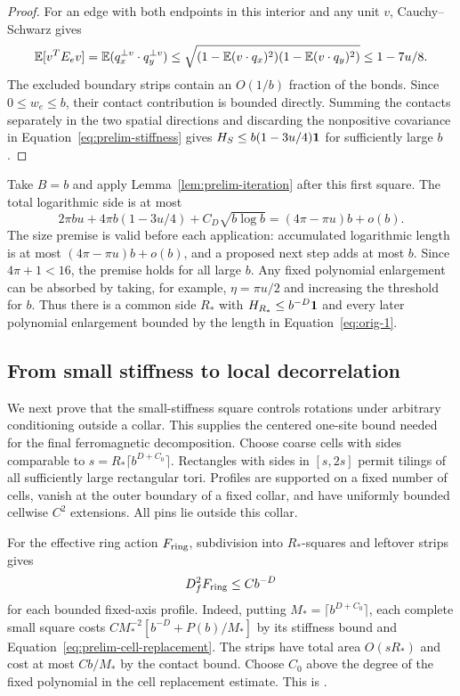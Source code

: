 \begin{proof}
For an edge with both endpoints in this interior and any unit $v$,
Cauchy--Schwarz gives
\[
 \mathbb E[v^TE_ev]
 =\mathbb E(q_x^{\perp v}\cdot q_y^{\perp v})
 \le\sqrt{(1-\mathbb E(v\cdot q_x)^2)(1-\mathbb E(v\cdot q_y)^2)}
 \le1-7u/8.
\]
The excluded boundary strips contain an $O(1/b)$ fraction of the
bonds. Since $0\le w_e\le b$, their contact contribution is bounded
directly. Summing the contacts separately in the two spatial directions
and discarding the nonpositive covariance in
Equation~\eqref{eq:prelim-stiffness} gives
$H_S\le b(1-3u/4)\mathbf 1$ for sufficiently large $b$.
\end{proof}

Take $B=b$ and apply Lemma~\ref{lem:prelim-iteration} after this first
square. The total logarithmic side is at most
\begin{equation}
 2\pi bu+4\pi b(1-3u/4)+C_D\sqrt{b\log b}
 =(4\pi-\pi u)b+o(b).
 \label{eq:prelim-total-length}
\end{equation}
The size premise is valid before each application: accumulated
logarithmic length is at most $(4\pi-\pi u)b+o(b)$, and a proposed next
step adds at most $b$. Since $4\pi+1<16$, the premise holds for all
large $b$. Any fixed polynomial enlargement can be absorbed by taking,
for example, $\eta=\pi u/2$ and increasing the threshold for $b$.
Thus there is a common side $R_*$ with
$H_{R_*}\le b^{-D}\mathbf 1$ and every later polynomial enlargement bounded
by the length in Equation~\eqref{eq:orig-1}.

\subsection{From small stiffness to local decorrelation}

We next prove that the small-stiffness square controls rotations under
arbitrary conditioning outside a collar. This supplies the centered
one-site bound needed for the final ferromagnetic decomposition.
Choose coarse cells with sides comparable to
$s=R_*\lceil b^{D+C_0}\rceil$. Rectangles with sides in $[s,2s]$
permit tilings of all sufficiently large rectangular tori. Profiles
are supported on a fixed number of cells, vanish at the outer boundary
of a fixed collar, and have uniformly bounded cellwise $C^2$
extensions. All pins lie outside this collar.

For the effective ring action $F_{\rm ring}$, subdivision into
$R_*$-squares and leftover strips gives
\begin{equation}
 D_f^2F_{\rm ring}\le Cb^{-D}
 \label{eq:prelim-profile-hessian}
\end{equation}
for each bounded fixed-axis profile. Indeed, putting
$M_*=\lceil b^{D+C_0}\rceil$, each complete small square costs
$CM_*^{-2}[b^{-D}+P(b)/M_*]$ by its stiffness bound and
Equation~\eqref{eq:prelim-cell-replacement}. The strips have total
area $O(sR_*)$ and cost at most $Cb/M_*$ by the contact bound.
Choose $C_0$ above the degree of the fixed polynomial in the cell
replacement estimate. This is .

